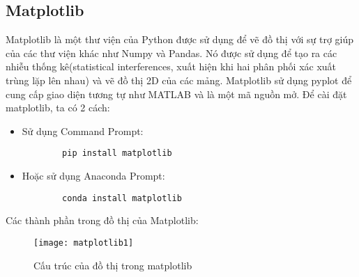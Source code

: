 \documentclass[../main-report.tex]{subfiles}
\begin{document}
\subsection{Matplotlib}
Matplotlib là một thư viện của Python được sử dụng để vẽ đồ thị với sự trợ giúp của các thư viện khác như Numpy và Pandas.
Nó được sử dụng để tạo ra các nhiễu thống kê(statistical interferences, xuất hiện khi hai phân phối xác xuất trùng lặp lên nhau) và vẽ đồ thị
2D của các mảng. Matplotlib sử dụng pyplot để cung cấp giao diện tương tự như MATLAB và là một mã nguồn mở.
Để cài đặt matplotlib, ta có 2 cách:
\begin{itemize}
    \item Sử dụng Command Prompt: 
    \begin{lstlisting}
        pip install matplotlib
    \end{lstlisting}
    \item Hoặc sử dụng Anaconda Prompt:
    \begin{lstlisting}
        conda install matplotlib
    \end{lstlisting}
\end{itemize}

Các thành phần trong đồ thị của Matplotlib:
\begin{figure}[ht!]
\centering\texttt{[image: matplotlib1]}
\caption{Cấu trúc của đồ thị trong matplotlib}
\label{fig:matplotlib1}
\end{figure}
\end{document}
